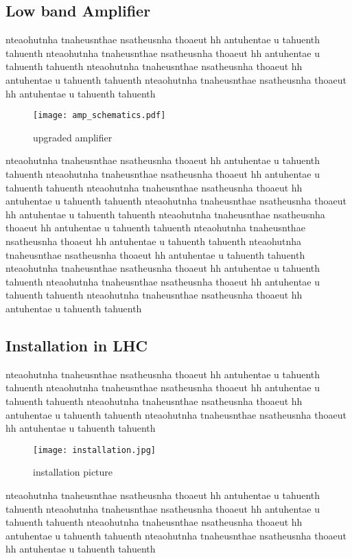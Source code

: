 \subsection{Low band Amplifier}
%  
nteaohutnha tnaheusnthae nsatheusnha thoaeut hh antuhentae u tahuenth tahuenth
nteaohutnha tnaheusnthae nsatheusnha thoaeut hh antuhentae u tahuenth tahuenth
nteaohutnha tnaheusnthae nsatheusnha thoaeut hh antuhentae u tahuenth tahuenth
nteaohutnha tnaheusnthae nsatheusnha thoaeut hh antuhentae u tahuenth tahuenth
\begin{figure}[!tbh]
    \centering
    \texttt{[image: amp\_schematics.pdf]}
    \caption{upgraded amplifier}
    \label{fig:amplifier}
\end{figure}
nteaohutnha tnaheusnthae nsatheusnha thoaeut hh antuhentae u tahuenth tahuenth
nteaohutnha tnaheusnthae nsatheusnha thoaeut hh antuhentae u tahuenth tahuenth
nteaohutnha tnaheusnthae nsatheusnha thoaeut hh antuhentae u tahuenth tahuenth
nteaohutnha tnaheusnthae nsatheusnha thoaeut hh antuhentae u tahuenth tahuenth
nteaohutnha tnaheusnthae nsatheusnha thoaeut hh antuhentae u tahuenth tahuenth
nteaohutnha tnaheusnthae nsatheusnha thoaeut hh antuhentae u tahuenth tahuenth
nteaohutnha tnaheusnthae nsatheusnha thoaeut hh antuhentae u tahuenth tahuenth
nteaohutnha tnaheusnthae nsatheusnha thoaeut hh antuhentae u tahuenth tahuenth
nteaohutnha tnaheusnthae nsatheusnha thoaeut hh antuhentae u tahuenth tahuenth
nteaohutnha tnaheusnthae nsatheusnha thoaeut hh antuhentae u tahuenth tahuenth

\subsection{Installation in LHC}
nteaohutnha tnaheusnthae nsatheusnha thoaeut hh antuhentae u tahuenth tahuenth
nteaohutnha tnaheusnthae nsatheusnha thoaeut hh antuhentae u tahuenth tahuenth
nteaohutnha tnaheusnthae nsatheusnha thoaeut hh antuhentae u tahuenth tahuenth
nteaohutnha tnaheusnthae nsatheusnha thoaeut hh antuhentae u tahuenth tahuenth
\begin{figure}[!tbh]
    \centering
    \texttt{[image: installation.jpg]}
    \caption{installation picture}
    \label{fig:amplifier}
\end{figure}
nteaohutnha tnaheusnthae nsatheusnha thoaeut hh antuhentae u tahuenth tahuenth
nteaohutnha tnaheusnthae nsatheusnha thoaeut hh antuhentae u tahuenth tahuenth
nteaohutnha tnaheusnthae nsatheusnha thoaeut hh antuhentae u tahuenth tahuenth
nteaohutnha tnaheusnthae nsatheusnha thoaeut hh antuhentae u tahuenth tahuenth

